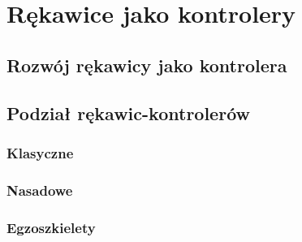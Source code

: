 \chapter{Rękawice jako kontrolery}
\label{ch:kontrolery}

\section{Rozwój rękawicy jako kontrolera}
\label{sec:rozwojVR}
	
\section{Podział rękawic-kontrolerów}
\label{sec:podzial}

	\subsection{Klasyczne}
	\label{subsec:klasyczne}
	
	\subsection{Nasadowe}
	\label{subsec:nasadowe}

	\subsection{Egzoszkielety}
	\label{subsec:egzo}	